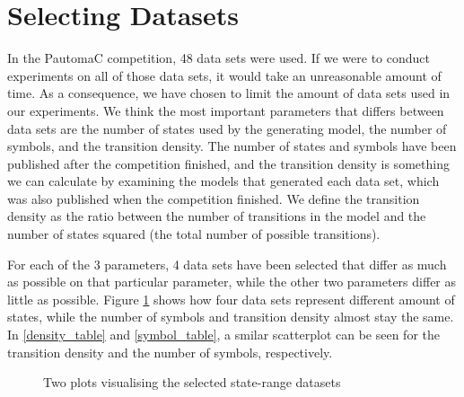 \section{Selecting Datasets}\label{sec:datasets}
In the PautomaC competition, 48 data sets were used. If we were to conduct experiments on all of those data sets, it would take an unreasonable amount of time.
As a consequence, we have chosen to limit the amount of data sets used in our experiments.
We think the most important parameters that differs between data sets are the number of states used by the generating model, the number of symbols, and the transition density. The number of states and symbols have been published after the competition finished, and the transition density is something we can calculate by examining the models that generated each data set, which was also published when the competition finished.
We define the transition density as the ratio between the number of transitions in the model and the number of states squared (the total number of possible transitions). 

For each of the 3 parameters, 4 data sets have been selected that differ as much as possible on that particular parameter, while the other two parameters differ as little as possible.
Figure \ref{fig:statesetplot} shows how four data sets represent different amount of states, while the number of symbols and transition density almost stay the same. In \ref{density_table} and \ref{symbol_table}, a smilar scatterplot can be seen for the transition density and the number of symbols, respectively.

\begin{figure}
	\centering
	\begin{subfigure}[b]{0.5\textwidth}
        \end{subfigure}%
		\begin{subfigure}[b]{0.5\textwidth}
	\end{subfigure}
  	\caption{Two plots visualising the selected state-range datasets}\label{fig:statesetplot}
\end{figure}

